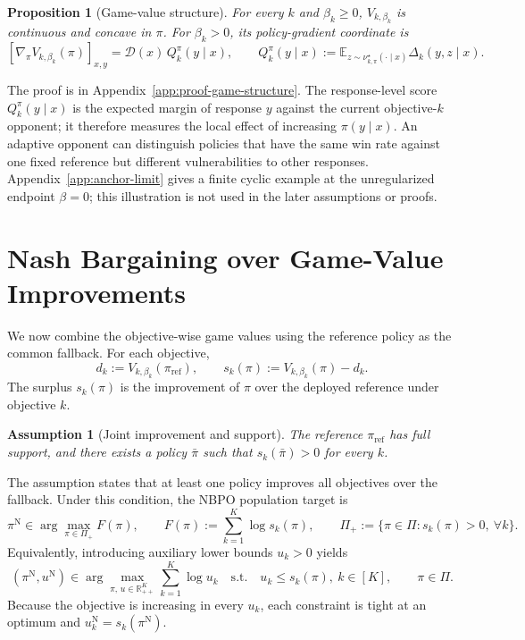 \documentclass{article}
\newtheorem{proposition}{Proposition}
\newtheorem{assumption}{Assumption}
\theoremstyle{remark}
\theoremstyle{plain}
\newcommand{\E}{\mathbb{E}}
\newcommand{\R}{\mathbb{R}}
\newcommand{\D}{\mathcal{D}}
\newcommand{\piref}{\pi_{\mathrm{ref}}}
\begin{document}
\begin{proposition}[Game-value structure]
\label{prop:game-structure}
For every $k$ and $\beta_k\ge0$, $V_{k,\beta_k}$ is continuous and concave in $\pi$. For $\beta_k>0$, its policy-gradient coordinate is
\begin{equation}
\left[\nabla_\pi V_{k,\beta_k}(\pi)\right]_{x,y}
=
\D(x)\,Q_k^\pi(y\mid x),
\qquad
Q_k^\pi(y\mid x)
:=
\E_{z\sim\nu^\star_{k,\pi}(\cdot\mid x)}
\Delta_k(y,z\mid x).
\label{eq:game-gradient}
\end{equation}
\end{proposition}
The proof is in Appendix~\ref{app:proof-game-structure}. The response-level score $Q_k^\pi(y\mid x)$ is the expected margin of response $y$ against the current objective-$k$ opponent; it therefore measures the local effect of increasing $\pi(y\mid x)$. An adaptive opponent can distinguish policies that have the same win rate against one fixed reference but different vulnerabilities to other responses. Appendix~\ref{app:anchor-limit} gives a finite cyclic example at the unregularized endpoint $\beta=0$; this illustration is not used in the later assumptions or proofs.

\section{Nash Bargaining over Game-Value Improvements}
\label{sec:bargaining}
We now combine the objective-wise game values using the reference policy as the common fallback. For each objective,
\begin{equation}
d_k:=V_{k,\beta_k}(\piref),
\qquad
s_k(\pi):=V_{k,\beta_k}(\pi)-d_k.
\label{eq:game-surplus}
\end{equation}
The surplus $s_k(\pi)$ is the improvement of $\pi$ over the deployed reference under objective $k$.

\begin{assumption}[Joint improvement and support]
\label{ass:joint}
The reference $\piref$ has full support, and there exists a policy $\bar\pi$ such that $s_k(\bar\pi)>0$ for every $k$.
\end{assumption}
The assumption states that at least one policy improves all objectives over the fallback. Under this condition, the NBPO population target is
\begin{equation}
\pi^{\mathrm N}
\in
\arg\max_{\pi\in\Pi_+}F(\pi),
\qquad
F(\pi):=\sum_{k=1}^K\log s_k(\pi),
\qquad
\Pi_+:=\{\pi\in\Pi:s_k(\pi)>0,\ \forall k\}.
\label{eq:nash-welfare}
\end{equation}
Equivalently, introducing auxiliary lower bounds $u_k>0$ yields
\begin{equation}
(\pi^{\mathrm N},u^{\mathrm N})
\in
\arg\max_{\pi,\,u\in\R_{++}^K}
\sum_{k=1}^K\log u_k
\quad
\text{s.t.}\quad
u_k\le s_k(\pi),\ k\in[K],
\qquad
\pi\in\Pi.
\label{eq:nash-bargaining}
\end{equation}
Because the objective is increasing in every $u_k$, each constraint is tight at an optimum and $u_k^{\mathrm N}=s_k(\pi^{\mathrm N})$.
\end{document}
